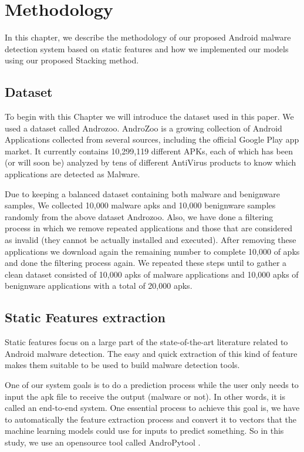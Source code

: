 \chapter{Methodology}

In this chapter, we describe the methodology of our proposed Android malware detection system based on static features and how we implemented our models using our proposed Stacking method.

\section{Dataset} \label{dataset}

To begin with this Chapter we will introduce the dataset used in this paper. We used a dataset called Androzoo.
AndroZoo is a growing collection of Android Applications collected from several sources, including the official Google Play app market.
It currently contains 10,299,119 different APKs, each of which has been (or will soon be) analyzed by tens of different AntiVirus products to know which applications are detected as Malware\cite{androzoo}.

Due to keeping a balanced dataset containing both malware and benignware samples,
We collected 10,000 malware \ac{apk}s and 10,000 benignware samples randomly from the above dataset Androzoo. Also, we have done a filtering process in which we remove repeated applications and those that are considered as invalid (they cannot be actually installed and executed). After removing these applications we download again the remaining number to complete 10,000 of \ac{apk}s and done the filtering process again. We repeated these steps until to gather a clean dataset consisted of 10,000 \ac{apk}s of malware applications and 10,000 \ac{apk}s of benignware applications with a total of 20,000 \ac{apk}s.

\section{Static Features extraction} \label{extractedvector}

Static features focus on a large part of the state-of-the-art literature related to Android malware
detection. The easy and quick extraction of this kind of feature makes them suitable to be used to build malware detection tools.

One of our system goals is to do a prediction process while the user only needs to input the \ac{apk} file to receive the output (malware or not). In other words, it is called an end-to-end system. One essential process to achieve this goal is, we have to automatically the feature extraction process and convert it to vectors that the machine learning models could use for inputs to predict something.
So in this study, we use an opensource tool called AndroPytool \cite{andropytool}.

